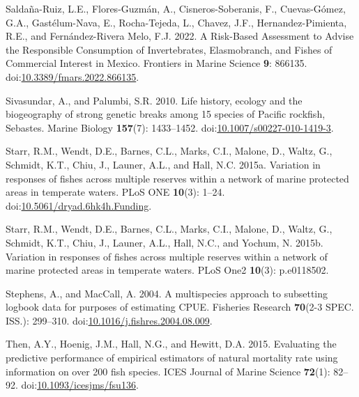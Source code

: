 \documentclass[11pt,
  english,
  letterpaper,
]{article}
\newlength{\cslhangindent}
\newenvironment{CSLReferences}[2] %
 {%
  \setlength{\parindent}{0pt}
  \ifodd #1 \everypar{\setlength{\hangindent}{\cslhangindent}}\ignorespaces\fi
  \ifnum #2 > 0
  \setlength{\parskip}{#2\baselineskip}
  \fi
 }%
 {}
\begin{document}
\begin{CSLReferences}{1}{0}
\leavevmode{}%
Saldaña-Ruiz, L.E., Flores-Guzmán, A., Cisneros-Soberanis, F., Cuevas-Gómez, G.A., Gastélum-Nava, E., Rocha-Tejeda, L., Chavez, J.F., Hernandez-Pimienta, R.E., and Fernández-Rivera Melo, F.J. 2022. A {Risk}-{Based} {Assessment} to {Advise} the {Responsible} {Consumption} of {Invertebrates}, {Elasmobranch}, and {Fishes} of {Commercial} {Interest} in {Mexico}. Frontiers in Marine Science \textbf{9}: 866135. doi:\href{https://doi.org/10.3389/fmars.2022.866135}{10.3389/fmars.2022.866135}.

\leavevmode{}%
Sivasundar, A., and Palumbi, S.R. 2010. Life history, ecology and the biogeography of strong genetic breaks among 15 species of {Pacific} rockfish, {Sebastes}. Marine Biology \textbf{157}(7): 1433--1452. doi:\href{https://doi.org/10.1007/s00227-010-1419-3}{10.1007/s00227-010-1419-3}.

\leavevmode{}%
Starr, R.M., Wendt, D.E., Barnes, C.L., Marks, C.I., Malone, D., Waltz, G., Schmidt, K.T., Chiu, J., Launer, A.L., and Hall, N.C. 2015a. Variation in responses of fishes across multiple reserves within a network of marine protected areas in temperate waters. PLoS ONE \textbf{10}(3): 1--24. doi:\href{https://doi.org/10.5061/dryad.6hk4h.Funding}{10.5061/dryad.6hk4h.Funding}.

\leavevmode{}%
Starr, R.M., Wendt, D.E., Barnes, C.L., Marks, C.I., Malone, D., Waltz, G., Schmidt, K.T., Chiu, J., Launer, A.L., Hall, N.C., and Yochum, N. 2015b. Variation in responses of fishes across multiple reserves within a network of marine protected areas in temperate waters. PLoS One2 \textbf{10}(3): p.e0118502.

\leavevmode{}%
Stephens, A., and MacCall, A. 2004. A multispecies approach to subsetting logbook data for purposes of estimating {CPUE}. Fisheries Research \textbf{70}(2-3 SPEC. ISS.): 299--310. doi:\href{https://doi.org/10.1016/j.fishres.2004.08.009}{10.1016/j.fishres.2004.08.009}.

\leavevmode{}%
Then, A.Y., Hoenig, J.M., Hall, N.G., and Hewitt, D.A. 2015. Evaluating the predictive performance of empirical estimators of natural mortality rate using information on over 200 fish species. ICES Journal of Marine Science \textbf{72}(1): 82--92. doi:\href{https://doi.org/10.1093/icesjms/fsu136}{10.1093/icesjms/fsu136}.


\end{CSLReferences}
\end{document}
